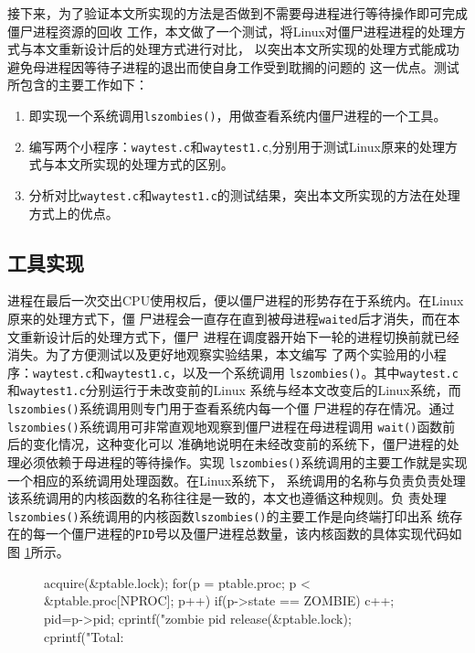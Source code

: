 \documentclass{swfuthesism}
\begin{document}
接下来，为了验证本文所实现的方法是否做到不需要母进程进行等待操作即可完成僵尸进程资源的回收
工作，本文做了一个测试，将Linux对僵尸进程进程的处理方式与本文重新设计后的处理方式进行对比，
以突出本文所实现的处理方式能成功避免母进程因等待子进程的退出而使自身工作受到耽搁的问题的
这一优点。测试所包含的主要工作如下： 
\begin{enumerate}
\item 即实现一个系统调用\texttt{lszombies()}，用做查看系统内僵尸进程的一个工具。
\item 编写两个小程序：\texttt{waytest.c}和\texttt{waytest1.c},分别用于测试Linux原来的处理方
  式与本文所实现的处理方式的区别。
\item 分析对比\texttt{waytest.c}和\texttt{waytest1.c}的测试结果，突出本文所实现的方法在处理
  方式上的优点。
\end{enumerate}

\subsection{工具实现}

进程在最后一次交出CPU使用权后，便以僵尸进程的形势存在于系统内。在Linux原来的处理方式下，僵
尸进程会一直存在直到被母进程\texttt{waited}后才消失，而在本文重新设计后的处理方式下，僵尸
进程在调度器开始下一轮的进程切换前就已经消失。为了方便测试以及更好地观察实验结果，本文编写
了两个实验用的小程序：\texttt{waytest.c}和\texttt{waytest1.c}，以及一个系统调用
\texttt{lszombies()}。其中\texttt{waytest.c}和\texttt{waytest1.c}分别运行于未改变前的Linux
系统与经本文改变后的Linux系统，而\texttt{lszombies()}系统调用则专门用于查看系统内每一个僵
尸进程的存在情况。通过\texttt{lszombies()}系统调用可非常直观地观察到僵尸进程在母进程调用
\texttt{wait()}函数前后的变化情况，这种变化可以
准确地说明在未经改变前的系统下，僵尸进程的处理必须依赖于母进程的等待操作。实现
\texttt{lszombies()}系统调用的主要工作就是实现一个相应的系统调用处理函数。在Linux系统下， 
系统调用的名称与负责负责处理该系统调用的内核函数的名称往往是一致的，本文也遵循这种规则。负
责处理\texttt{lszombies()}系统调用的内核函数\texttt{lszombies()}的主要工作是向终端打印出系
统存在的每一个僵尸进程的\texttt{PID}号以及僵尸进程总数量，该内核函数的具体实现代码如图
\ref{fig:lst:lszombiescode}所示。 

\begin{figure}
  \begin{codeblock}
\begin{ccode}
acquire(&ptable.lock);
for(p = ptable.proc; p < &ptable.proc[NPROC]; p++){
  if(p->state == ZOMBIE){
    c++;
    pid=p->pid;
    cprintf("zombie pid %
  }
}
release(&ptable.lock);
cprintf("Total: %
\end{ccode}
  \end{codeblock}
  \label{fig:lst:lszombiescode}
\end{figure}
\end{document}
